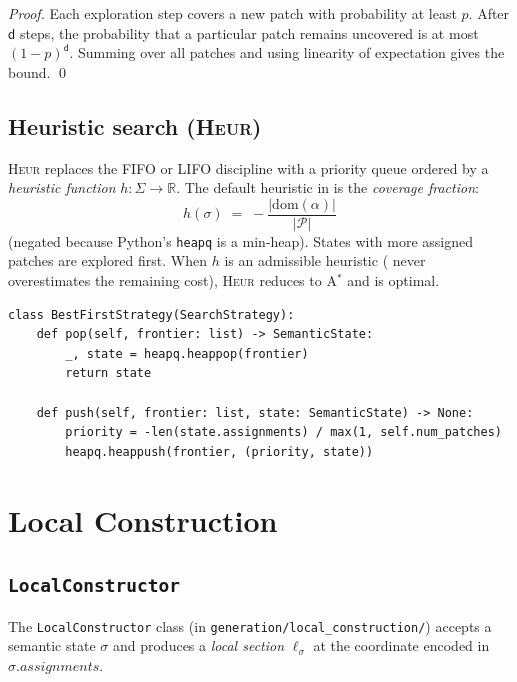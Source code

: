\documentclass[11pt]{article}
\newcommand{\St}{\Sigma}                      %
\newcommand{\state}{\sigma}                   %
\newcommand{\HEUR}{\textsc{Heur}}
\newcommand{\depth}{\mathsf{d}}               %
\newcommand{\heur}{h}                         %
\newcommand{\LocalSec}{\ell}                  %
\newcommand{\patchset}{\mathcal{P}}           %
\begin{document}
\begin{proof}
Each exploration step covers a new patch with probability at least
$p$.  After $\depth$ steps, the probability that a particular patch
remains uncovered is at most $(1-p)^{\depth}$.  Summing over all
patches and using linearity of expectation gives the bound.  \qed
\end{proof}

\subsection{Heuristic search (\HEUR{})}

\HEUR{} replaces the FIFO or LIFO discipline with a priority queue
ordered by a \emph{heuristic function} $\heur\colon \St \to \mathbb{R}$.
The default heuristic in \JuGeo{} is the \emph{coverage fraction}:
\[
  \heur(\state) \;=\;
  -\frac{|\mathrm{dom}(\alpha)|}{|\patchset|}
\]
(negated because Python's \texttt{heapq} is a min-heap).  States with
more assigned patches are explored first.  When $\heur$ is an
admissible heuristic (\ie{} never overestimates the remaining cost),
\HEUR{} reduces to A$^*$ and is optimal.

\begin{lstlisting}[style=jugeo-python, caption={Priority-queue pop for \HEUR{}.}]
class BestFirstStrategy(SearchStrategy):
    def pop(self, frontier: list) -> SemanticState:
        _, state = heapq.heappop(frontier)
        return state

    def push(self, frontier: list, state: SemanticState) -> None:
        priority = -len(state.assignments) / max(1, self.num_patches)
        heapq.heappush(frontier, (priority, state))
\end{lstlisting}

\section{Local Construction}\label{sec:local}

\subsection{\texttt{LocalConstructor}}

The \texttt{LocalConstructor} class (in
\texttt{generation/local\_construction/}) accepts a semantic state
$\state$ and produces a \emph{local section} $\LocalSec_{\state}$ at
the coordinate encoded in $\state.assignments$.
\end{document}
